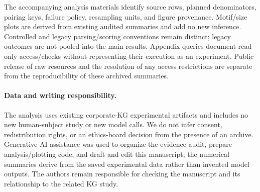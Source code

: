 The accompanying analysis materials identify source rows, planned denominators, pairing keys, failure policy, resampling units, and figure provenance. Motif/size plots are derived from existing audited summaries and add no new inference. Controlled and legacy parsing/scoring conventions remain distinct; legacy outcomes are not pooled into the main results. Appendix queries document read-only access/checks without representing their execution as an experiment. Public release of raw resources and the resolution of any access restrictions are separate from the reproducibility of these archived summaries.

\paragraph{Data and writing responsibility.}
The analysis uses existing corporate-KG experimental artifacts and includes no new human-subject study or new model calls. We do not infer consent, redistribution rights, or an ethics-board decision from the presence of an archive. Generative AI assistance was used to organize the evidence audit, prepare analysis/plotting code, and draft and edit this manuscript; the numerical summaries derive from the saved experimental data rather than invented model outputs. The authors remain responsible for checking the manuscript and its relationship to the related KG study.
